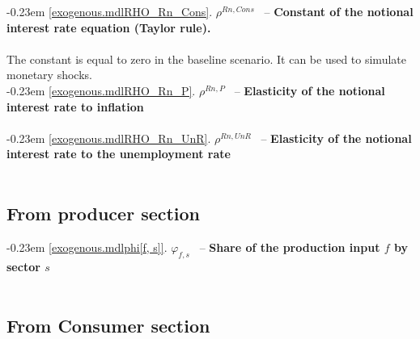 \documentclass[12pt]{article}
\numberwithin{equation}{section}
\begin{document}
\noindent \kern-0.23em \noindent \begingroup {} \label{exogenous.mdlRHO_Rn_Cons}\ref{exogenous.mdlRHO_Rn_Cons}.
         
        \ensuremath{\rho^{Rn,Cons}}~ \endgroup -- \noindent \textbf{Constant of the notional interest rate equation (Taylor rule).}  \\ \\[-8pt]The constant is equal to zero in the baseline scenario. It can be used to simulate monetary shocks. \\


\noindent \kern-0.23em \noindent \begingroup {} \label{exogenous.mdlRHO_Rn_P}\ref{exogenous.mdlRHO_Rn_P}.
         
        \ensuremath{\rho^{Rn,P}}~ \endgroup -- \noindent \textbf{Elasticity of the notional interest rate to inflation}  \\ \\[-8pt]


\noindent \kern-0.23em \noindent \begingroup {} \label{exogenous.mdlRHO_Rn_UnR}\ref{exogenous.mdlRHO_Rn_UnR}.
         
        \ensuremath{\rho^{Rn,UnR}}~ \endgroup -- \noindent \textbf{Elasticity of the notional interest rate to the unemployment rate}  \\ \\[-8pt]












\subsection{From producer section}



\noindent \kern-0.23em \noindent \begingroup {} \label{exogenous.mdlphi[f, s]}\ref{exogenous.mdlphi[f, s]}.
         
        \ensuremath{\varphi_{f, s}}~ \endgroup -- \noindent \textbf{ Share of the production input $f$ by sector $s$}  \\ \\[-8pt]











\subsection{From Consumer section}
\end{document}
